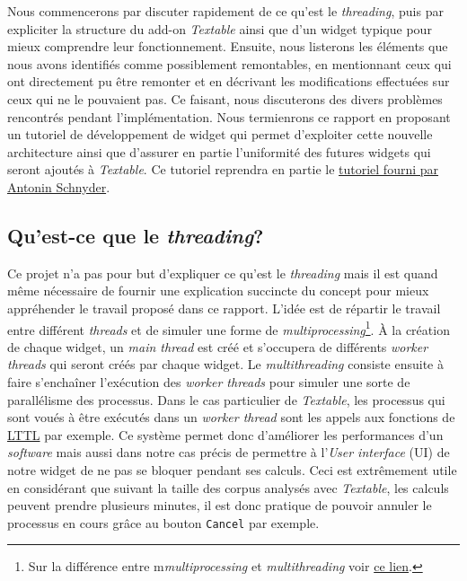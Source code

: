 \documentclass{article}
\begin{document}
Nous commencerons par discuter rapidement de ce qu'est le \textit{threading}, puis par expliciter la structure du add-on \textit{Textable} ainsi que d'un widget typique pour mieux comprendre leur fonctionnement. Ensuite, nous listerons les éléments que nous avons identifiés comme possiblement remontables, en mentionnant ceux qui ont directement pu être remonter et en décrivant les modifications effectuées sur ceux qui ne le pouvaient pas. Ce faisant, nous discuterons des divers problèmes rencontrés pendant l'implémentation. Nous termienrons ce rapport en proposant un tutoriel de développement de widget qui permet d'exploiter cette nouvelle architecture ainsi que d'assurer en partie l'uniformité des futures widgets qui seront ajoutés à \textit{Textable}. Ce tutoriel reprendra en partie le \href{https://docs.google.com/document/d/1QtXm2aYMZXAyM7mfBTqxt_XrTNFqC7e3aqy7OC1A_18/edit}{tutoriel fourni par Antonin Schnyder}.

\subsection{Qu'est-ce que le \textit{threading}?}

Ce projet n'a pas pour but d'expliquer ce qu'est le \textit{threading} mais il est quand même nécessaire de fournir une explication succincte du concept pour mieux appréhender le travail proposé dans ce rapport.
L'idée est de répartir le travail entre différent \textit{threads} et de simuler une forme de \textit{multiprocessing}\footnote{Sur la différence entre m\textit{multiprocessing} et \textit{multithreading} voir \href{https://www.geeksforgeeks.org/difference-between-multithreading-vs-multiprocessing-in-python/}{ce lien}.}. À la création de chaque widget, un \textit{main thread} est créé et s'occupera de différents \textit{worker threads} qui seront créés par chaque widget. Le \textit{multithreading} consiste ensuite à faire s'enchaîner l'exécution des \textit{worker threads} pour simuler une sorte de parallélisme des processus. Dans le cas particulier de \textit{Textable}, les processus qui sont voués à être exécutés dans un \textit{worker thread} sont les appels aux fonctions de \href{https://github.com/axanthos/LTTL}{LTTL} par exemple.
Ce système permet donc d'améliorer les performances d'un \textit{software} mais aussi dans notre cas précis de permettre à l'\textit{User interface} (UI) de notre widget de ne pas se bloquer pendant ses calculs. Ceci est extrêmement utile en considérant que suivant la taille des corpus analysés avec \textit{Textable}, les calculs peuvent prendre plusieurs minutes, il est donc pratique de pouvoir annuler le processus en cours grâce au bouton \texttt{Cancel} par exemple.
\end{document}
